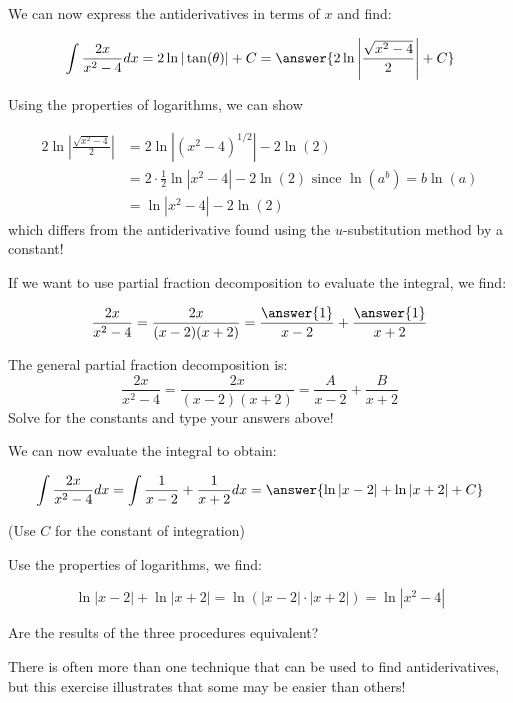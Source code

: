 \documentclass{ximera}
\begin{document}
\begin{exercise}
\begin{exercise}
\begin{exercise}
\begin{exercise}
\begin{exercise}
We can now express the antiderivatives in terms of $x$ and find:
 
\[
\int \frac{2x}{x^2-4} dx =  2 \ln|\tan(\theta)|+C = \answer{2 \ln \left| \frac{\sqrt{x^2-4}}{2} \right| +C}
\]
 
\begin{exercise}
Using the properties of logarithms, we can show
 
\begin{align*}
2 \ln \left| \frac{ \sqrt{x^2-4} }{2} \right| & = 2 \ln \left|(x^2-4)^{1/2} \right| - 2 \ln(2) \\
& = 2 \cdot \frac{1}{2} \ln \left| x^2-4 \right| - 2 \ln(2) \textrm{ since } \ln\left(a^b\right) = b \ln(a) \\
& =  \ln \left|x^2-4 \right| - 2 \ln(2)
\end{align*}
which differs from the antiderivative found using the $u$-substitution method by a constant!
 
\end{exercise}
\end{exercise}
\end{exercise}
\end{exercise}
\end{exercise}
 
 
If we want to use partial fraction decomposition to evaluate the integral, we find:
 
\[
\frac{2x}{x^2-4} = \frac{2x}{(x-2)(x+2)} = \frac{\answer{1}}{x-2}+\frac{\answer{1}}{x+2}
\]
\begin{hint}
The general partial fraction decomposition is:
\[
\frac{2x}{x^2-4} = \frac{2x}{(x-2)(x+2)} = \frac{A}{x-2}+\frac{B}{x+2}
\]
Solve for the constants and type your answers above!
\end{hint}
 
\begin{exercise}
We can now evaluate the integral to obtain:
 
\[
\int \frac{2x}{x^2-4} dx = \int \frac{1}{x-2}+\frac{1}{x+2} dx = \answer{\ln|x-2| + \ln|x+2|+C}
\]
  
(Use $C$ for the constant of integration)
 
\begin{exercise}
Use the properties of logarithms, we find:
 
\[ \ln|x-2| + \ln|x+2| = \ln \left( |x-2| \cdot |x+2|  \right) = \ln \left| x^2-4  \right| \]
\end{exercise}
\end{exercise}
 
\begin{exercise}
Are the results of the three procedures equivalent?
\begin{multipleChoice}
\end{multipleChoice}
There is often more than one technique that can be used to find antiderivatives, but this exercise illustrates that some may be easier than others!
\end{exercise}
\end{exercise}
\end{document}
